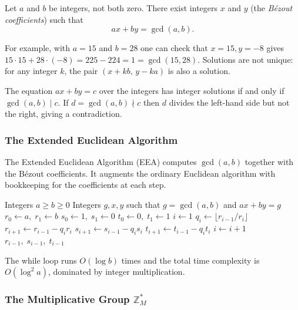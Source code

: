 \begin{theorem}
\label{thm:bezout}
Let $a$ and $b$ be integers, not both zero. There exist integers $x$ and $y$ (the \emph{Bézout coefficients}) such that
\[
    ax + by = \gcd(a,b).
\]
\end{theorem}

For example, with $a=15$ and $b=28$ one can check that $x=15, y=-8$ gives $15 \cdot 15 + 28 \cdot (-8) = 225 - 224 = 1 = \gcd(15,28)$. Solutions are not unique: for any integer $k$, the pair $(x+kb,\, y-ka)$ is also a solution.

\begin{remark}
The equation $ax+by=c$ over the integers has integer solutions if and only if $\gcd(a,b) \mid c$. If $d = \gcd(a,b) \nmid c$ then $d$ divides the left-hand side but not the right, giving a contradiction.
\end{remark}

\subsubsection{The Extended Euclidean Algorithm}

The Extended Euclidean Algorithm (EEA) computes $\gcd(a,b)$ together with the Bézout coefficients. It augments the ordinary Euclidean algorithm with bookkeeping for the coefficients at each step.

\begin{algorithm}[H]
\caption{Extended Euclidean Algorithm}
\begin{algorithmic}[1]
\Require Integers $a \geq b \geq 0$
\Ensure Integers $g,x,y$ such that $g = \gcd(a,b)$ and $ax+by=g$
\State $r_0 \leftarrow a,\; r_1 \leftarrow b$
\State $s_0 \leftarrow 1,\; s_1 \leftarrow 0$
\State $t_0 \leftarrow 0,\; t_1 \leftarrow 1$
\State $i \leftarrow 1$
    \State $q_i \leftarrow \lfloor r_{i-1}/r_i \rfloor$
    \State $r_{i+1} \leftarrow r_{i-1} - q_i r_i$
    \State $s_{i+1} \leftarrow s_{i-1} - q_i s_i$
    \State $t_{i+1} \leftarrow t_{i-1} - q_i t_i$
    \State $i \leftarrow i+1$
\EndWhile
\State \Return $r_{i-1},\; s_{i-1},\; t_{i-1}$
\end{algorithmic}
\end{algorithm}

The while loop runs $O(\log b)$ times and the total time complexity is $O(\log^2 a)$, dominated by integer multiplication.

\subsubsection{The Multiplicative Group \texorpdfstring{$\mathbb{Z}_M^*$}{Z*\_M}}


